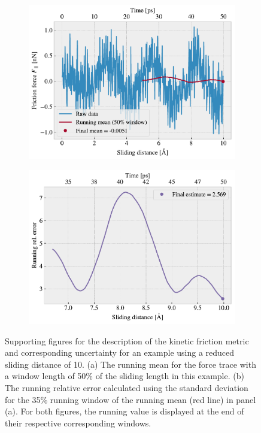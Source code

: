 \begin{figure}[H]
  \centering
  \begin{subfigure}[t]{0.49\textwidth}
    \centering
    \includegraphics[width=\textwidth]{figures/baseline/Ff_runmean.pdf}
    \caption{}
    \label{fig:runmean}
  \end{subfigure}
  \hfill
  \begin{subfigure}[t]{0.49\textwidth}
      \centering
      \includegraphics[width=\textwidth]{figures/baseline/Ff_runstd.pdf}
      \caption{}
      \label{fig:runstd}
  \end{subfigure}
  \caption{Supporting figures for the description of the kinetic friction metric and corresponding uncertainty for an example using a reduced sliding distance of \SI{10}{{}}. (a) The running mean for the force trace with a window length of 50\% of the sliding length in this example. (b) The running relative error calculated using the standard deviation for the 35\% running window of the running mean (red line) in panel (a). For both figures, the running value is displayed at the end of their respective corresponding windows.}
  \label{fig:running}
\end{figure}

